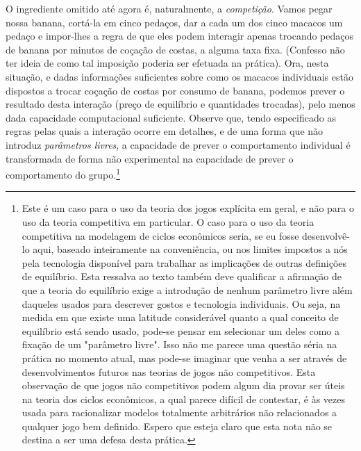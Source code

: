 \documentclass[12pt]{article}
\begin{document}
O ingrediente omitido até agora é, naturalmente, a \textit{competição}. Vamos pegar nossa banana, cortá-la em cinco pedaços, dar a cada um dos cinco macacos um pedaço e impor-lhes a regra de que eles podem interagir apenas trocando pedaços de banana por minutos de coçação de costas, a alguma taxa fixa. (Confesso não ter ideia de como tal imposição poderia ser efetuada na prática). Ora, nesta situação, e dadas informações suficientes sobre como os macacos individuais estão dispostos a trocar coçação de costas por consumo de banana, podemos prever o resultado desta interação (preço de equilíbrio e quantidades trocadas), pelo menos dada capacidade computacional suficiente. Observe que, tendo especificado as regras pelas quais a interação ocorre em detalhes, e de uma forma que não introduz \textit{parâmetros livres}, a capacidade de prever o comportamento individual é transformada de forma não experimental na capacidade de prever o comportamento do grupo.\footnote{Este é um caso para o uso da teoria dos jogos explícita em geral, e não para o uso da teoria competitiva em particular. O caso para o uso da teoria competitiva na modelagem de ciclos econômicos seria, se eu fosse desenvolvê-lo aqui, baseado inteiramente na conveniência, ou nos limites impostos a nós pela tecnologia disponível para trabalhar as implicações de outras definições de equilíbrio. Esta ressalva ao texto também deve qualificar a afirmação de que a teoria do equilíbrio exige a introdução de nenhum parâmetro livre além daqueles usados para descrever gostos e tecnologia individuais. Ou seja, na medida em que existe uma latitude considerável quanto a qual conceito de equilíbrio está sendo usado, pode-se pensar em selecionar um deles como a fixação de um "parâmetro livre". Isso não me parece uma questão séria na prática no momento atual, mas pode-se imaginar que venha a ser através de desenvolvimentos futuros nas teorias de jogos não competitivos. Esta observação de que jogos não competitivos podem algum dia provar ser úteis na teoria dos ciclos econômicos, a qual parece difícil de contestar, é às vezes usada para racionalizar modelos totalmente arbitrários não relacionados a qualquer jogo bem definido. Espero que esteja claro que esta nota não se destina a ser uma defesa desta prática.}
\end{document}
